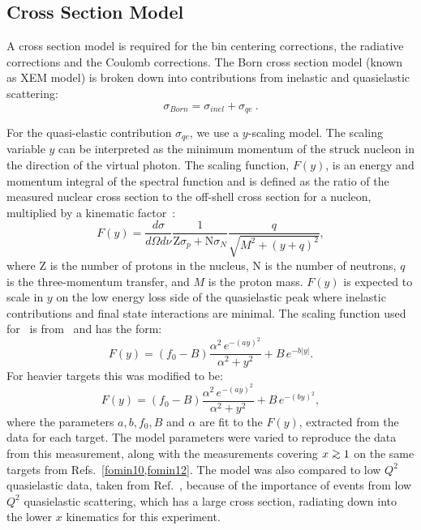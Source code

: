 \subsection{Cross Section Model}\label{modelxsec_sec}

A cross section model is required for the bin centering corrections, the
radiative corrections and the Coulomb corrections. The Born cross section
model (known as XEM model) is broken down into contributions from inelastic
and quasielastic scattering:
%
\begin{equation}
\label{Bornmodel_eqn}
\sigma_{Born} =\sigma_{inel} + \sigma_{qe} ~.
\end{equation}

For the quasi-elastic contribution $\sigma_{qe}$, we use a $y$-scaling model.
The scaling variable $y$ can be interpreted as the minimum momentum of the
struck nucleon in the direction of the virtual photon. The scaling function,
$F(y)$, is an energy and momentum integral of the spectral function and is
defined as the ratio of the measured nuclear cross section to the off-shell
cross section for a nucleon, multiplied by a kinematic
factor~\cite{day_fymodel, johna_thesis, nadia_thesis}:
%
\begin{equation}
\label{Fy_eqn}
F(y) = \frac{d\sigma}{d\Omega d\nu}\frac{1}{\mathrm{Z}\sigma_p +
\mathrm{N}\sigma_N} \frac{q}{\sqrt{M^2 +(y+q)^2}},
\end{equation}
%
where Z is the number of protons in the nucleus, N is the number of neutrons,
$q$ is the three-momentum transfer, and $M$ is the proton mass. $F(y)$ is
expected to scale in $y$ on the low energy loss side of the quasielastic peak
where inelastic contributions and final state interactions are minimal. The
scaling function used for \LD\, is from~\cite{Mckeown_fymodel} and has the
form:
%
\begin{equation}
\label{Fy_eqn2}
F(y) =(f_0-B) \frac{\alpha^2\, e^{-(ay)^2}}{\alpha^2+y^2} + B \, e^{-b|y|}.
\end{equation}
%
For heavier targets this was modified to be:
%
\begin{equation}
\label{Fy_eqn3}
 F(y) =(f_0-B) \frac{\alpha^2\, e^{-(ay)^2}}{\alpha^2+y^2} + B \, e^{-(by)^2},
\end{equation}
%
where the parameters $a, b, f_0, B $ and $\alpha$ are fit to the $F(y)$,
extracted from the data for each target.  The model parameters were varied
to reproduce the data from this measurement, along with the measurements
covering $x \gtorder 1$ on the same targets from Refs.~\ref{fomin10,fomin12}.
The model was also compared to low $Q^2$ quasielastic data, taken from
Ref.~\cite{Benhar:qe_archive}, because of the importance of events from low
$Q^2$ quasielastic scattering, which has a large cross section, radiating
down into the lower $x$ kinematics for this experiment.

